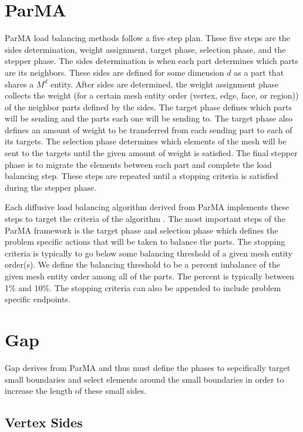 \documentclass{thesis}
\begin{document}
\section{ParMA}

ParMA load balancing methods follow a five step plan. These five steps 
are the sides determination, weight assignment, target phase, selection
phase, and the stepper phase. The sides determination is when each part 
determines which parts are its neighbors. These sides are defined for some
 dimension $d$ as a part that shares a $M^d$ entity. After sides are 
determined, the weight assignment phase collects the weight (for a certain 
mesh entity order (vertex, edge, face, or region)) of the neighbor parts 
defined by the sides. The 
target phase defines which parts will be sending and the parts each one 
will be sending to. The target phase also defines an amount of weight to 
be transferred from each sending part to each of its targets. The selection 
phase determines which elements of the mesh will be sent to the targets 
until the given amount of weight is satisfied. The final stepper phase is 
to migrate the elements between each part and complete the load balancing 
step. These steps are repeated until a stopping criteria is satisfied 
during the stepper phase. 

Each diffusive load balancing algorithm derived from ParMA implements these 
steps to target the criteria of the algorithm \cite{parma}. The most important 
steps of the ParMA framework is the target phase and selection phase which 
defines the problem specific actions that will be taken to balance the parts. 
The stopping criteria is typically to go below some balancing threshold of 
a given mesh entity order(s). We define the balancing threshold to be a 
percent imbalance of the given mesh entity order among all of the parts. 
The percent is typically between 1\% and 10\%. The stopping criteria can also 
be appended to include problem specific endpoints.
 
  
\section{Gap}

Gap derives from ParMA and thus must define the phases to sepcifically target 
small boundaries and select elements around the small boundaries in order 
to increase the length of these small sides. 

\subsection{Vertex Sides}
\end{document}
